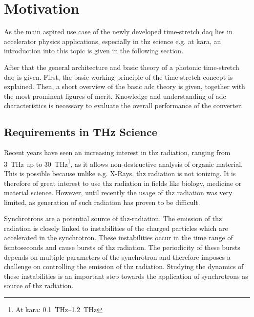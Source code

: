 \chapter{Motivation}
As the main aspired use case of the newly developed time-stretch \gls{daq} lies in accelerator physics applications, especially in \gls{thz} science e.g. at \gls{kara}, an introduction into this topic is given in the following section. 

After that the general architecture and basic theory of a photonic time-stretch \gls{daq} is given.
First, the basic working principle of the time-stretch concept is explained.
Then, a short overview of the basic \gls{adc} theory is given, together with the most prominent figures of merit. 
Knowledge and understanding of \gls{adc} characteristics is necessary to evaluate the overall performance of the converter. 

\section{Requirements in THz Science}
Recent years have seen an increasing interest in \gls{thz} radiation, ranging from \SI{3}{\tera \hertz} up to \SI{30}{\tera \hertz}\footnote{At \gls{kara}: \SIrange{0.1}{1.2}{\tera \hertz}}, as it allows non-destructive analysis of organic material. 
This is possible because unlike e.g. X-Rays, \gls{thz} radiation is not ionizing.
It is therefore of great interest to use \gls{thz} radiation in fields like biology, medicine or material science.
However, until recently the usage of \gls{thz} radiation was very limited, as generation of such radiation has proven to be difficult.

Synchrotrons are a potential source of \gls{thz}-radiation. %
The emission of \gls{thz} radiation is closely linked to instabilities of the charged particles which are accelerated in the synchrotron. \cite{mueller2012}
These instabilities occur in the time range of femtoseconds and cause bursts of \gls{thz} radiation.
The periodicity of these bursts depends on multiple parameters of the synchrotron and therefore imposes a challenge on controlling the emission of \gls{thz} radiation.
Studying the dynamics of these instabilities is an important step towards the application of synchrotrons as source of \gls{thz} radiation. \cite{rota2018}



